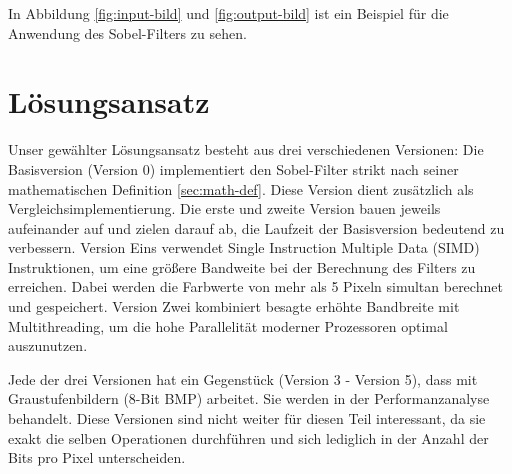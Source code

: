 \documentclass[course=erap]{aspdoc}
\begin{document}
In Abbildung \ref{fig:input-bild} und \ref{fig:output-bild} ist ein Beispiel für die Anwendung des Sobel-Filters zu sehen.

\section{Lösungsansatz}
Unser gewählter Lösungsansatz besteht aus drei verschiedenen Versionen:
Die Basisversion (Version 0) implementiert den Sobel-Filter strikt nach seiner mathematischen Definition \ref{sec:math-def}.
Diese Version dient zusätzlich als Vergleichsimplementierung.
Die erste und zweite Version bauen jeweils aufeinander auf und zielen darauf ab, die Laufzeit der Basisversion bedeutend zu verbessern.
Version Eins verwendet Single Instruction Multiple Data (SIMD) Instruktionen, um eine größere Bandweite bei der Berechnung des Filters zu erreichen.
Dabei werden die Farbwerte von mehr als 5 Pixeln simultan berechnet und gespeichert.
Version Zwei kombiniert besagte erhöhte Bandbreite mit Multithreading, um die hohe Parallelität moderner Prozessoren optimal auszunutzen.

Jede der drei Versionen hat ein Gegenstück (Version 3 - Version 5), dass mit Graustufenbildern (8-Bit BMP) arbeitet.
Sie werden in der Performanzanalyse behandelt.
Diese Versionen sind nicht weiter für diesen Teil interessant, da sie exakt die selben Operationen durchführen und sich lediglich in der Anzahl der Bits pro Pixel unterscheiden.
\end{document}
